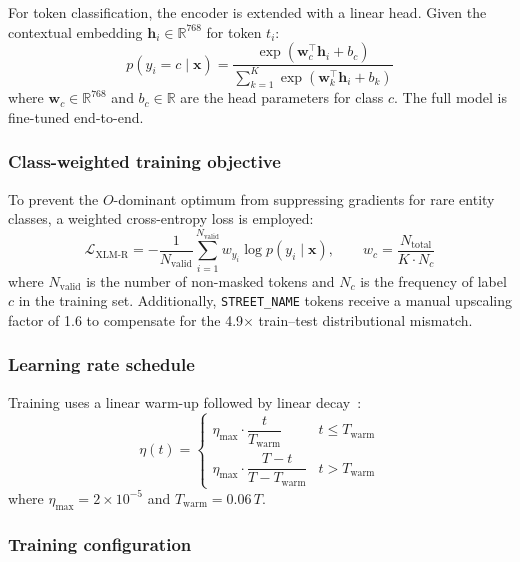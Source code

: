 For token classification, the encoder is extended with a linear head. Given the contextual embedding $\mathbf{h}_i \in \mathbb{R}^{768}$ for token $t_i$:
\begin{equation}
  p(y_i = c \mid \mathbf{x}) = \frac{\exp(\mathbf{w}_c^\top \mathbf{h}_i + b_c)}{\displaystyle\sum_{k=1}^{K} \exp(\mathbf{w}_k^\top \mathbf{h}_i + b_k)}
  \label{eq:xlmr_softmax}
\end{equation}
where $\mathbf{w}_c \in \mathbb{R}^{768}$ and $b_c \in \mathbb{R}$ are the head parameters for class $c$. The full model is fine-tuned end-to-end.

\subsubsection{Class-weighted training objective}

To prevent the $O$-dominant optimum from suppressing gradients for rare entity classes, a weighted cross-entropy loss is employed:
\begin{equation}
  \mathcal{L}_{\text{XLM-R}} = -\frac{1}{N_{\text{valid}}} \sum_{i=1}^{N_{\text{valid}}} w_{y_i} \log p(y_i \mid \mathbf{x}), \qquad w_c = \frac{N_{\text{total}}}{K \cdot N_c}
  \label{eq:class_weight}
\end{equation}
where $N_{\text{valid}}$ is the number of non-masked tokens and $N_c$ is the frequency of label $c$ in the training set. Additionally, \texttt{STREET\_NAME} tokens receive a manual upscaling factor of 1.6 to compensate for the 4.9$\times$ train--test distributional mismatch.

\subsubsection{Learning rate schedule}

Training uses a linear warm-up followed by linear decay~\cite{devlin2019bert}:
\begin{equation}
  \eta(t) =
  \begin{cases}
    \eta_{\max} \cdot \dfrac{t}{T_{\text{warm}}} & t \leq T_{\text{warm}} \\[6pt]
    \eta_{\max} \cdot \dfrac{T - t}{T - T_{\text{warm}}} & t > T_{\text{warm}}
  \end{cases}
  \label{eq:lr_schedule}
\end{equation}
where $\eta_{\max} = 2 \times 10^{-5}$ and $T_{\text{warm}} = 0.06\,T$.

\subsubsection{Training configuration}

